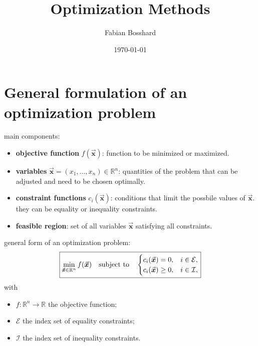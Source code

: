 \documentclass[9pt, headings=standardclasses, parskip=half]{scrartcl}
\title{Optimization Methods}
\author{Fabian Bosshard}
\date{\today}
\renewcommand{\emph}[1]{\textcolor{mypurple}{#1}}
\newcommand{\vect}[1]{\vec{\boldsymbol{#1}}}
\begin{document}
\maketitle
\tableofcontents















\clearpage
\section{General formulation of an optimization problem}

main components:
\begin{itemize}
	\item \textbf{objective function} $f(\vect{x})$: function to be minimized or maximized.
	\item \textbf{variables} $\vect{x} = (x_1, \ldots, x_n) \in \mathbb{R}^n$: quantities of the problem that can be adjusted and need to be chosen \emph{optimally}.
	\item \textbf{constraint functions} $c_i(\vect{x})$: conditions that limit the possbile values of $\vect{x}$. they can be \emph{equality} or \emph{inequality} constraints.
	\item \textbf{feasible region}: set of all variables $\vect{x}$ satisfying all constraints.
\end{itemize}

general form of an optimization problem:
\begin{equation}
{
\label{eq:form_optimization_problem}
\boxed{
 \min_{\vect{x} \in \mathbb{R}^{n}} f(\vect{x}) \quad \text{subject to} \quad \begin{cases}c_{i}(\vect{x})=0, & i \in \mathcal{E}, \\ c_{i}(\vect{x}) \geq 0, & i \in \mathcal{I},\end{cases}
 }
}
\end{equation}
with
\begin{itemize}
  \item \(f: \mathbb{R}^{n} \rightarrow \mathbb{R}\) the objective function;
  \item \(\mathcal{E}\) the index set of equality constraints;
  \item \(\mathcal{I}\) the index set of inequality constraints.
\end{itemize}
\end{document}
